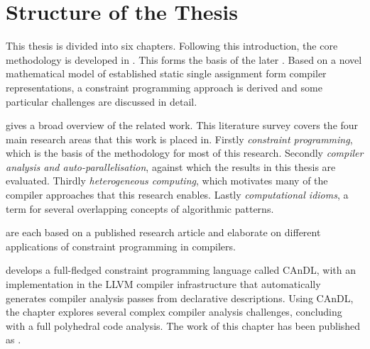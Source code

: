 

\newpage
\phantom{placeholder}
\newpage

\section{Structure of the Thesis}

    This thesis is divided into six chapters.
    Following this introduction, the core methodology is developed in
    {\bf{}}.
    This forms the basis of the later
    {\bf{}}.
    Based on a novel mathematical model of established static single assignment
    form compiler representations, a constraint programming approach is derived
    and some particular challenges are discussed in detail.

    {\bf{}} gives a broad overview of the related work.
    This literature survey covers the four main research areas that this work
    is placed in.
    Firstly {\em constraint programming}, which is the basis of the methodology
    for most of this research.
    Secondly {\em compiler analysis and auto-parallelisation}, against which the
    results in this thesis are evaluated.
    Thirdly {\em heterogeneous computing}, which motivates many of the compiler
    approaches that this research enables.
    Lastly {\em computational idioms}, a term for several overlapping concepts
    of algorithmic patterns.

    {\bf{}}
    are each based on a published research article and elaborate on different
    applications of constraint programming in compilers.

    {\bf{}} develops a full-fledged constraint programming
    language called CAnDL, with an implementation in the LLVM compiler
    infrastructure that automatically generates compiler analysis passes from
    declarative descriptions.
    Using CAnDL, the chapter explores several complex compiler analysis
    challenges, concluding with a full polyhedral code analysis.
    The work of this chapter has been published as
    {\bf\citet{Ginsbach:2018:CDS:3178372.3179515}}.

